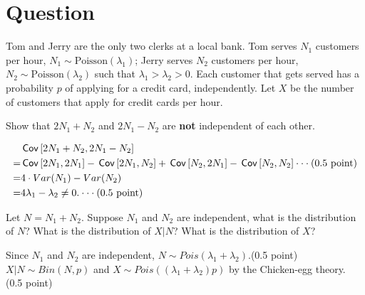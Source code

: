 \section{Question}
Tom and Jerry are the only two clerks at a local bank. Tom serves $N_1$ customers per hour, $N_1\sim \text{Poisson}(\lambda_1)$; Jerry serves $N_2$ customers per hour, $N_2\sim \text{Poisson}(\lambda_2)$ such that $\lambda_1>\lambda_2>0$. Each customer that gets served has a probability $p$ of applying for a credit card, independently. Let $X$ be the number of customers that apply for credit cards per hour.
\begin{exercise}[1]
 Show that $2N_1+N_2$ and $2N_1-N_2$ are \textbf{not} independent of each other.

\begin{solution}
\begin{align*}
   & \,\mathsf{Cov}\left[2N_1+N_2, 2N_1-N_2\right]\\
  = & \,\mathsf{Cov}\left[2N_1,2N_1\right]-\,\mathsf{Cov}\left[2N_1,N_2\right]+\,\mathsf{Cov}\left[N_2,2N_1\right]-\,\mathsf{Cov}\left[N_2,N_2\right]\cdot \cdot \cdot \text{(0.5 point)}\\
  = & 4\cdot Var(N_1)-Var(N_2)\\
  =& 4\lambda_1-\lambda_2 \neq 0.\cdot \cdot \cdot \text{(0.5 point)}
\end{align*}
\end{solution}
\end{exercise}

\begin{exercise}[1]
Let $N=N_1+N_2$. Suppose $N_1$ and $N_2$ are independent, what is the distribution of  $N$? What is the distribution of $X|N$?  What is the distribution of $X$?
\begin{solution}
Since $N_1$ and $N_2$ are independent, $N\sim Pois(\lambda_1+\lambda_2).$(0.5 point)\\
$X|N\sim Bin(N,p)$ and $X\sim Pois((\lambda_1+\lambda_2) p)$ by the Chicken-egg theory. (0.5 point)
\end{solution}
\end{exercise}



